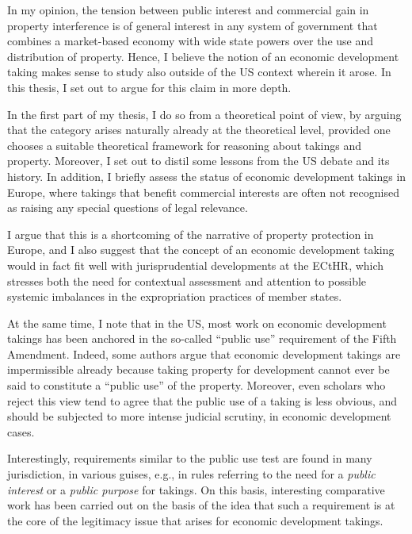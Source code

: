 In my opinion, the tension between public interest and commercial gain in property interference is of general interest in any system of government that combines a market-based economy with wide state powers over the use and distribution of property. Hence, I believe the notion of an economic development taking makes sense to study also outside of the US context wherein it arose. In this thesis, I set out to argue for this claim in more depth. 

In the first part of my thesis, I do so from a theoretical point of view, by arguing that the category arises naturally already at the theoretical level, provided one chooses a suitable theoretical framework for reasoning about takings and property. Moreover, I set out to distil some lessons from the US debate and its history. In addition, I briefly assess the status of economic development takings in Europe, where takings that benefit commercial interests are often not recognised as raising any special questions of legal relevance. 

I argue that this is a shortcoming of the narrative of property protection in Europe, and I also suggest that the concept of an economic development taking would in fact fit well with jurisprudential developments at the ECtHR, which stresses both the need for contextual assessment and attention to possible systemic imbalances in the expropriation practices of member states.

At the same time, I note that in the US, most work on economic development takings has been anchored in the so-called ``public use'' requirement of the Fifth Amendment. Indeed, some authors argue that economic development takings are impermissible already because taking property for development cannot ever be said to constitute a ``public use'' of the property. Moreover, even scholars who reject this view tend to agree that the public use of a taking is less obvious, and should be subjected to more intense judicial scrutiny, in economic development cases.

Interestingly, requirements similar to the public use test are found in many jurisdiction, in various guises, e.g., in rules referring to the need for a {\it public interest} or a {\it public purpose} for takings. On this basis, interesting comparative work has been carried out on the basis of the idea that such a requirement is at the core of the legitimacy issue that arises for economic development takings.

